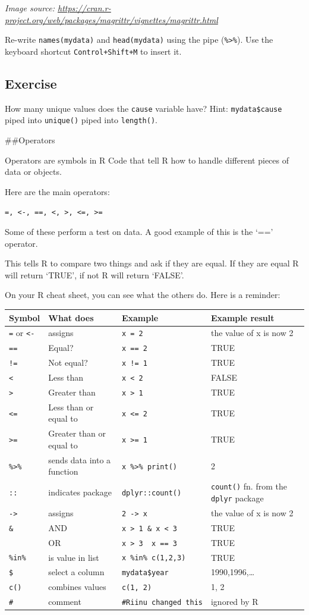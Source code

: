 \documentclass[]{book}
\theoremstyle{definition}
\theoremstyle{definition}
\theoremstyle{definition}
\theoremstyle{remark}
\begin{document}
\emph{Image source:
\url{https://cran.r-project.org/web/packages/magrittr/vignettes/magrittr.html}}

Re-write \texttt{names(mydata)} and \texttt{head(mydata)} using the pipe
(\texttt{\%\textgreater{}\%}). Use the keyboard shortcut
\texttt{Control+Shift+M} to insert it.

\hypertarget{exercise-5}{%
\subsection{Exercise}\label{exercise-5}}

How many unique values does the \texttt{cause} variable have? Hint:
\texttt{mydata\$cause} piped into \texttt{unique()} piped into
\texttt{length()}.

\#\#Operators

Operators are symbols in R Code that tell R how to handle different
pieces of data or objects.

Here are the main operators:

\texttt{=,\ \textless{}-,\ ==,\ \textless{},\ \textgreater{},\ \textless{}=,\ \textgreater{}=}

Some of these perform a test on data. A good example of this is the `=='
operator.

This tells R to compare two things and ask if they are equal. If they
are equal R will return `TRUE', if not R will return `FALSE'.

On your R cheat sheet, you can see what the others do. Here is a
reminder:

\begin{longtable}[]{@{}llll@{}}
\toprule
Symbol & What does & Example & Example result\tabularnewline
\midrule
\endhead
\texttt{=} or \texttt{\textless{}-} & assigns & \texttt{x\ =\ 2} & the
value of x is now 2\tabularnewline
\texttt{==} & Equal? & \texttt{x\ ==\ 2} & TRUE\tabularnewline
\texttt{!=} & Not equal? & \texttt{x\ !=\ 1} & TRUE\tabularnewline
\texttt{\textless{}} & Less than & \texttt{x\ \textless{}\ 2} &
FALSE\tabularnewline
\texttt{\textgreater{}} & Greater than & \texttt{x\ \textgreater{}\ 1} &
TRUE\tabularnewline
\texttt{\textless{}=} & Less than or equal to &
\texttt{x\ \textless{}=\ 2} & TRUE\tabularnewline
\texttt{\textgreater{}=} & Greater than or equal to &
\texttt{x\ \textgreater{}=\ 1} & TRUE\tabularnewline
\texttt{\%\textgreater{}\%} & sends data into a function &
\texttt{x\ \%\textgreater{}\%\ print()} & 2\tabularnewline
\texttt{::} & indicates package & \texttt{dplyr::count()} &
\texttt{count()} fn. from the \texttt{dplyr} package\tabularnewline
\texttt{-\textgreater{}} & assigns & \texttt{2\ -\textgreater{}\ x} &
the value of x is now 2\tabularnewline
\texttt{\&} & AND & \texttt{x\ \textgreater{}\ 1\ \&\ x\ \textless{}\ 3}
& TRUE\tabularnewline
\texttt{\textbar{}} & OR &
\texttt{x\ \textgreater{}\ 3\ \textbar{}\ x\ ==\ 3} &
TRUE\tabularnewline
\texttt{\%in\%} & is value in list & \texttt{x\ \%in\%\ c(1,2,3)} &
TRUE\tabularnewline
\texttt{\$} & select a column & \texttt{mydata\$year} &
1990,1996,\ldots{}\tabularnewline
\texttt{c()} & combines values & \texttt{c(1,\ 2)} & 1, 2\tabularnewline
\texttt{\#} & comment & \texttt{\#Riinu\ changed\ this} & ignored by
R\tabularnewline
\bottomrule
\end{longtable}
\end{document}

